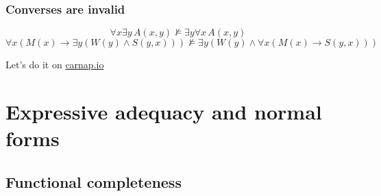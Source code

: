 \begin{frame}
  \frametitle{Converses are invalid}

  \[
    \forall x\exists y\, A(x, y) \not\models \exists y\forall x\, A(x, y)
\]
\[
    \forall x(M(x) \to \exists y(W(y) \land S(y, x)))
    \not\models \exists y(W(y) \land \forall x(M(x) \to S(y, x)))
\]

  Let's do it on \href{https://carnap.io/shared/rzach@ucalgary.ca/Practice\%20Problems\%20VI.md}{carnap.io}
\end{frame}

\newhourlecture
\newonlinelecture

\section{Expressive adequacy and normal forms}

\subsection{Functional completeness}

